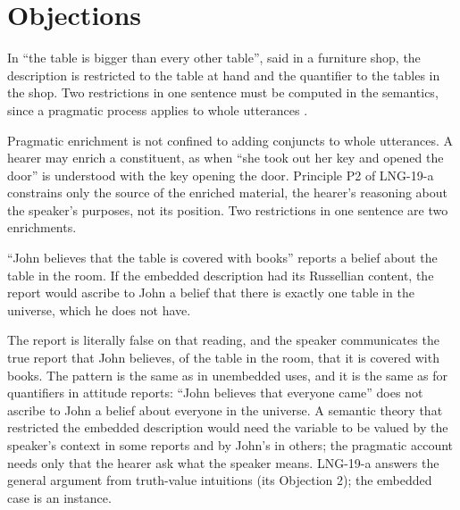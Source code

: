 \documentclass{situationist-preprint}
\begin{document}
\section{Objections}

\begin{objection}
In \enquote{the table is bigger than every other table}, said in a furniture shop, the description is restricted to the table at hand and the quantifier to the tables in the shop. Two restrictions in one sentence must be computed in the semantics, since a pragmatic process applies to whole utterances \citep{StanleySzabo2000}.
\end{objection}

\begin{reply}
Pragmatic enrichment is not confined to adding conjuncts to whole utterances. A hearer may enrich a constituent, as when \enquote{she took out her key and opened the door} is understood with the key opening the door. Principle P2 of LNG-19-a constrains only the source of the enriched material, the hearer's reasoning about the speaker's purposes, not its position. Two restrictions in one sentence are two enrichments.
\end{reply}

\begin{objection}
\enquote{John believes that the table is covered with books} reports a belief about the table in the room. If the embedded description had its Russellian content, the report would ascribe to John a belief that there is exactly one table in the universe, which he does not have.
\end{objection}

\begin{reply}
The report is literally false on that reading, and the speaker communicates the true report that John believes, of the table in the room, that it is covered with books. The pattern is the same as in unembedded uses, and it is the same as for quantifiers in attitude reports: \enquote{John believes that everyone came} does not ascribe to John a belief about everyone in the universe. A semantic theory that restricted the embedded description would need the variable to be valued by the speaker's context in some reports and by John's in others; the pragmatic account needs only that the hearer ask what the speaker means. LNG-19-a answers the general argument from truth-value intuitions (its Objection 2); the embedded case is an instance.
\end{reply}
\end{document}
